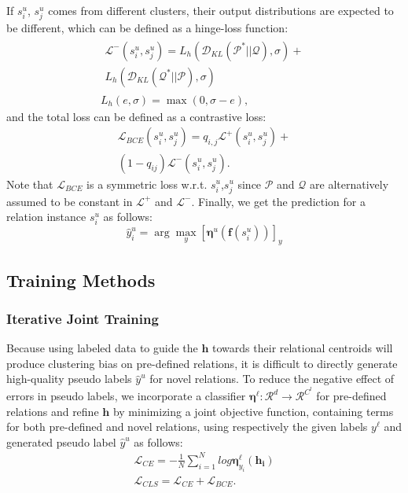 \documentclass[11pt]{article}
\begin{document}
        If $s_i^u$, $s_j^u$ comes from different clusters, their output distributions are expected to be different, which can be defined as a hinge-loss function:
            \begin{gather}
                \begin{split} 
                    \mathcal{L}^-(s_i^u,s_j^u)=L_h(\mathcal{D}_{KL}(\mathcal{P^*}||\mathcal{Q}),\sigma)+\\
                    L_h(\mathcal{D}_{KL}(\mathcal{Q^*}||\mathcal{P}),\sigma)
                \end{split}
               \\
                L_h(e,\sigma)=\max (0,\sigma-e),
            \end{gather}            
            and the total loss can be defined as a contrastive loss:
            \begin{equation}
                \begin{split}
                    \mathcal{L}_{BCE}(s_i^u,s_j^u)=q_{i,j}\mathcal{L}^+(s_i^u,s_j^u)+
                    \\(1-q_{ij})\mathcal{L}^-(s_i^u,s_j^u).
                \end{split}
            \end{equation}
        Note that $\mathcal{L}_{BCE}$ is a symmetric loss w.r.t. $s_i^u$,$s_j^u$ since $\mathcal{P}$ and $\mathcal{Q}$ are alternatively assumed to be constant in $\mathcal{L}^+$ and $\mathcal{L}^-$. Finally, we get the prediction for a relation instance $s_i^u$ as follows:
        \begin{equation}
            \hat{y}_i^u=\arg \max_y[\bm{\eta}^u(\bm{f}(s_i^u))]_y    \label{equ:yu}
        \end{equation}
    \subsection{Training Methods}  
        \subsubsection{Iterative Joint Training}
        Because using labeled data to guide the $\bm{h}$ towards their relational centroids will produce clustering bias on pre-defined relations, it is difficult to directly generate high-quality pseudo labels $\hat{y}^u$ for novel relations. To reduce the negative effect of errors in pseudo labels, we incorporate a classifier $\bm{\eta}^\ell:\mathcal{R}^d\rightarrow\mathcal{R}^{C^l}$ for pre-defined relations and refine $\bm{h}$ by minimizing a joint objective function, containing terms for both pre-defined and novel relations, using respectively the given labels $y^\ell$ and generated pseudo label $\hat{y}^u$ as follows:
        \begin{gather}
          \mathcal{L}_{CE}=-\frac{1}{N}\sum_{i=1}^{N}log\bm{\eta}^\ell_{y_i}(\bm{h_i}) \label{equ:CE}\\
          \mathcal{L}_{CLS}=\mathcal{L}_{CE}+\mathcal{L}_{BCE}.
        \end{gather}
\end{document}
